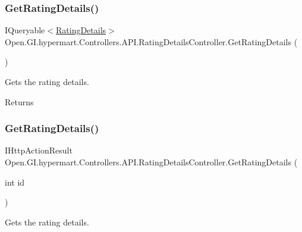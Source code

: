 \subsubsection{\texorpdfstring{Get\+Rating\+Details()}{GetRatingDetails()}\hspace{0.1cm}{\footnotesize\ttfamily [1/2]}}
{\footnotesize\ttfamily I\+Queryable$<$\hyperlink{class_open_1_1_g_i_1_1hypermart_1_1_models_1_1_rating_details}{Rating\+Details}$>$ Open.\+G\+I.\+hypermart.\+Controllers.\+A\+P\+I.\+Rating\+Details\+Controller.\+Get\+Rating\+Details (\begin{DoxyParamCaption}{ }\end{DoxyParamCaption})}



Gets the rating details. 

\begin{DoxyReturn}{Returns}

\end{DoxyReturn}
\hypertarget{class_open_1_1_g_i_1_1hypermart_1_1_controllers_1_1_a_p_i_1_1_rating_details_controller_a498b197bc682eea0f658ce9b8f44df0e}{}\label{class_open_1_1_g_i_1_1hypermart_1_1_controllers_1_1_a_p_i_1_1_rating_details_controller_a498b197bc682eea0f658ce9b8f44df0e} 
\subsubsection{\texorpdfstring{Get\+Rating\+Details()}{GetRatingDetails()}\hspace{0.1cm}{\footnotesize\ttfamily [2/2]}}
{\footnotesize\ttfamily I\+Http\+Action\+Result Open.\+G\+I.\+hypermart.\+Controllers.\+A\+P\+I.\+Rating\+Details\+Controller.\+Get\+Rating\+Details (\begin{DoxyParamCaption}\item[{int}]{id }\end{DoxyParamCaption})}



Gets the rating details. 


